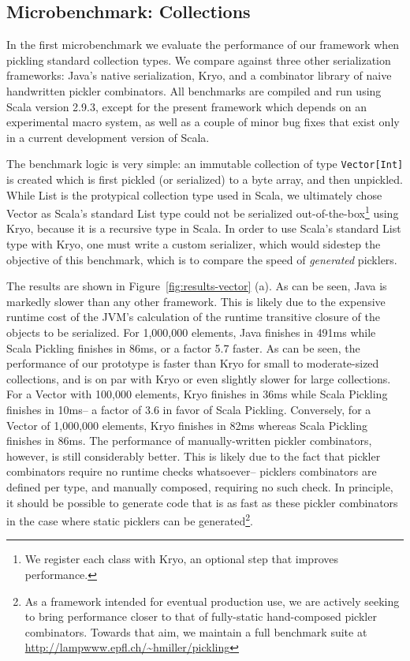 \documentclass[preprint,10pt]{sigplanconf}
\theoremstyle{definition}
\theoremstyle{definition}
\begin{document}
\subsection{Microbenchmark: Collections}

In the first microbenchmark we evaluate the performance of our
framework when pickling standard collection types. We compare against
three other serialization frameworks: Java's native serialization,
Kryo, and a combinator library of naive handwritten pickler combinators. All
benchmarks are compiled and run using Scala version 2.9.3, except for
the present framework which depends on an experimental macro system,
as well as a couple of minor bug fixes that exist only in a current
development version of Scala.

The benchmark logic is very simple: an immutable collection of type
\verb|Vector[Int]| is created which is first pickled (or serialized)
to a byte array, and then unpickled. While List is the protypical collection type used in Scala, we ultimately chose Vector as
Scala's standard List type could not be serialized out-of-the-box\footnote{We register each class with Kryo, an optional step that improves performance.}
using Kryo, because it is a recursive type in Scala. In order to use Scala's standard List type with Kryo, one must write a custom serializer, which would sidestep the objective of this benchmark, which is to compare the speed of {\em generated} picklers.

The results are
shown in Figure~\ref{fig:results-vector} (a). As can be seen, Java is markedly slower than any other framework. This is likely due to the expensive runtime cost of the JVM's calculation of the runtime transitive closure of the objects to be serialized. For 1,000,000 elements, Java finishes in 491ms while Scala Pickling finishes in 86ms, or a factor 5.7 faster. As can be seen, the
performance of our prototype is faster than Kryo for small to moderate-sized collections, and is on par with Kryo or even slightly slower for large collections. For a Vector with 100,000 elements, Kryo finishes in 36ms while Scala Pickling finishes in 10ms-- a factor of 3.6 in favor of Scala Pickling. Conversely, for a Vector of 1,000,000 elements, Kryo finishes in 82ms whereas Scala Pickling finishes in 86ms. The
performance of manually-written pickler combinators, however, is still
considerably better. This is likely due to the fact that pickler combinators require no runtime checks whatsoever-- picklers combinators are defined per type, and manually composed, requiring no such check. In principle, it should be possible to generate code
that is as fast as these pickler combinators in the case
where static picklers can be generated\footnote{As a framework intended for eventual production use, we are actively seeking to bring performance closer to that of fully-static hand-composed pickler combinators. Towards that aim, we maintain a full benchmark suite at \url{http://lampwww.epfl.ch/~hmiller/pickling}}.
\end{document}
